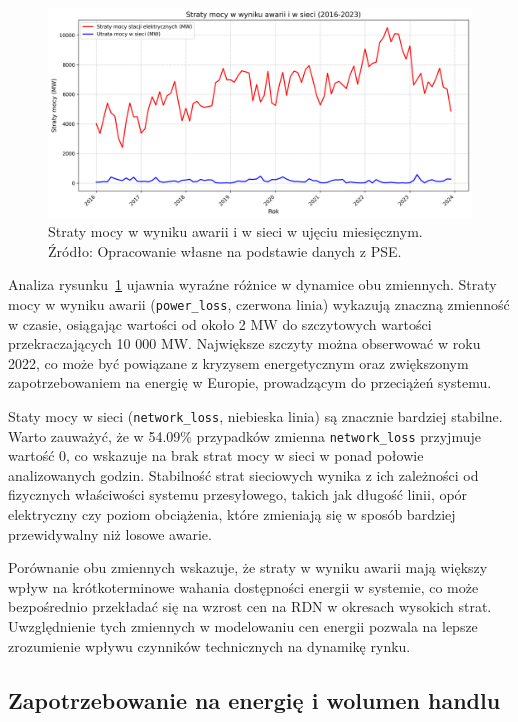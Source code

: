 \begin{figure}[h]
    \centering
    \includegraphics[width=1.0\textwidth]{../plots/losses/power_losses.png}
    \caption{Straty mocy w wyniku awarii i w sieci w ujęciu miesięcznym. Źródło: Opracowanie własne na podstawie danych z PSE.}
    \label{fig:power_losses}
\end{figure}

Analiza rysunku~\ref{fig:power_losses} ujawnia wyraźne różnice w dynamice obu zmiennych. Straty mocy w wyniku awarii (\texttt{power\_loss}, czerwona linia) wykazują znaczną zmienność w czasie, osiągając wartości od około 2 MW do szczytowych wartości przekraczających 10 000 MW. Największe szczyty można obserwować w roku 2022, co może być powiązane z kryzysem energetycznym oraz zwiększonym zapotrzebowaniem na energię w Europie, prowadzącym do przeciążeń systemu.

Staty mocy w sieci (\texttt{network\_loss}, niebieska linia) są znacznie bardziej stabilne. Warto zauważyć, że w 54.09\% przypadków zmienna \texttt{network\_loss} przyjmuje wartość 0, co wskazuje na brak strat mocy w sieci w ponad połowie analizowanych godzin. Stabilność strat sieciowych wynika z ich zależności od fizycznych właściwości systemu przesyłowego, takich jak długość linii, opór elektryczny czy poziom obciążenia, które zmieniają się w sposób bardziej przewidywalny niż losowe awarie.

Porównanie obu zmiennych wskazuje, że straty w wyniku awarii mają większy wpływ na krótkoterminowe wahania dostępności energii w systemie, co może bezpośrednio przekładać się na wzrost cen na RDN w okresach wysokich strat. Uwzględnienie tych zmiennych w modelowaniu cen energii pozwala na lepsze zrozumienie wpływu czynników technicznych na dynamikę rynku.

\subsection{Zapotrzebowanie na energię i wolumen handlu}
\label{subsec:demand}

